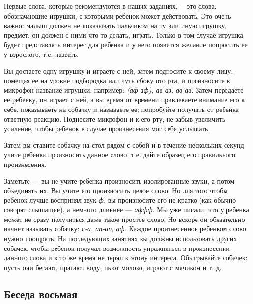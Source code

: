 \documentclass{book}
\renewcommand{\emph}[1]{\textit{#1}}
\begin{document}
Первые слова, которые рекомендуются в наших заданиях,--- это слова,
обозначающие игрушки, с которыми ребенок может действовать. Это очень
важно: малыш должен не показывать пальчиком на ту или иную игрушку,
предмет, он должен с ними что-то делать, играть. Только в том случае
игрушка будет представлять интерес для ребенка и у него появится желание
попросить ее у взрослого, т.е. назвать.

Вы достаете одну игрушку и играете с ней, затем подносите к своему лицу,
помещая ее на уровне подбородка или чуть сбоку ото рта, и произносите в
микрофон название игрушки, например: \emph{(аф-аф), ав-ав, ав-ав.} Затем
передаете ее ребенку, он играет с ней, а вы время от времени привлекаете
внимание его к себе, показываете на собачку и называете ее; попробуйте
получить от ребенка ответную реакцию. Поднесите микрофон и к его рту, не
забыв увеличить усиление, чтобы ребенок в случае произнесения мог себя
услышать.

Затем вы ставите собачку на стол рядом с собой и в течение нескольких
секунд учите ребенка произносить данное слово, т.е. дайте образец его
правильного произнесения.

Заметьте --- вы не учите ребенка произносить изолированные звуки, а
потом объединять их. Вы учите его произносить целое слово. Но для того
чтобы ребенок лучше воспринял звук \emph{ф,} вы произносите его не
кратко (как обычно говорят слышащие), а немного длиннее --- \emph{аффф.}
Мы уже писали, что у ребенка может не сразу получиться даже такое
простое слово. Но вскоре он обязательно начнет называть собачку:
\emph{а-а, ап-ап, аф.} Каждое произнесенное ребенком слово нужно
поощрять. На последующих занятиях вы должны использовать других собачек,
чтобы ребенок получал возможность упражняться в произнесении данного
слова и в то же время не терял к этому интереса. Обыгрывайте собачек:
пусть они бегают, прагают воду, пьют молоко, играют с мячиком и т. д.

\subsection*{Беседа восьмая}
\end{document}
